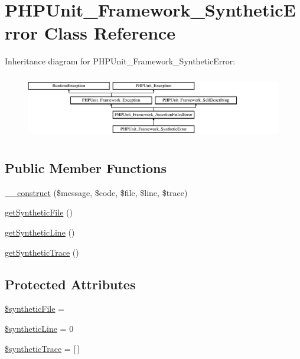 \hypertarget{class_p_h_p_unit___framework___synthetic_error}{}\section{P\+H\+P\+Unit\+\_\+\+Framework\+\_\+\+Synthetic\+Error Class Reference}
\label{class_p_h_p_unit___framework___synthetic_error}
Inheritance diagram for P\+H\+P\+Unit\+\_\+\+Framework\+\_\+\+Synthetic\+Error\+:\begin{figure}[H]
\begin{center}
\leavevmode
\includegraphics[height=2.860792cm]{class_p_h_p_unit___framework___synthetic_error}
\end{center}
\end{figure}
\subsection*{Public Member Functions}
\begin{DoxyCompactItemize}
\item 
\mbox{\hyperlink{class_p_h_p_unit___framework___synthetic_error_a2e2984890f9af7cfcd82d544b56c0f4c}{\+\_\+\+\_\+construct}} (\$message, \$code, \$file, \$line, \$trace)
\item 
\mbox{\hyperlink{class_p_h_p_unit___framework___synthetic_error_ab1d261848cc447a05bcc3d1327f88cd6}{get\+Synthetic\+File}} ()
\item 
\mbox{\hyperlink{class_p_h_p_unit___framework___synthetic_error_a1880f11b2bdcbec0d8aca58a95ebb70a}{get\+Synthetic\+Line}} ()
\item 
\mbox{\hyperlink{class_p_h_p_unit___framework___synthetic_error_a15d2e8e5f8e680669b6c0bc9af15271c}{get\+Synthetic\+Trace}} ()
\end{DoxyCompactItemize}
\subsection*{Protected Attributes}
\begin{DoxyCompactItemize}
\item 
\mbox{\hyperlink{class_p_h_p_unit___framework___synthetic_error_acf285c03112cd4f00b7a753cac4f8e3a}{\$synthetic\+File}} = \textquotesingle{}\textquotesingle{}
\item 
\mbox{\hyperlink{class_p_h_p_unit___framework___synthetic_error_a94f636546b8cca9002375f73cc734f1a}{\$synthetic\+Line}} = 0
\item 
\mbox{\hyperlink{class_p_h_p_unit___framework___synthetic_error_a4a91efb7fad5834e87684d9830fa059a}{\$synthetic\+Trace}} = \mbox{[}$\,$\mbox{]}
\end{DoxyCompactItemize}


